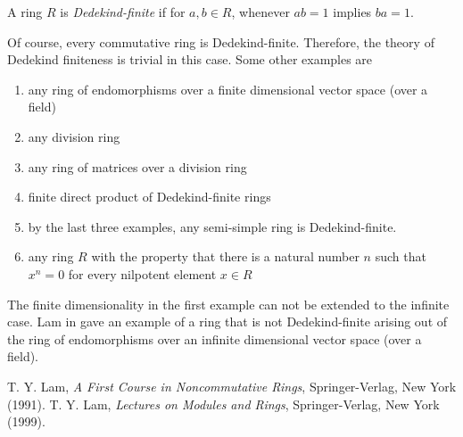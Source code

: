 \documentclass[12pt]{article}
\begin{document}
A ring $R$ is \emph{Dedekind-finite} if for $a, b \in R$, whenever $ab=1$ implies $ba=1$.

Of course, every commutative ring is Dedekind-finite.  Therefore, the theory of Dedekind finiteness is trivial in this case.  Some other examples are 
\begin{enumerate}
\item any ring of endomorphisms over a finite dimensional vector space (over a field)
\item any division ring
\item any ring of matrices over a division ring
\item finite direct product of Dedekind-finite rings
\item by the last three examples, any semi-simple ring is Dedekind-finite.
\item any ring $R$ with the property that there is a natural number $n$ such that $x^n=0$ for every nilpotent element $x\in R$
\end{enumerate}

The finite dimensionality in the first example can not be extended to the infinite case.  Lam in \cite{lam} gave an example of a ring that is not Dedekind-finite arising out of the ring of endomorphisms over an infinite dimensional vector space (over a field).

\begin{thebibliography}{8}
 T. Y. Lam, {\em A First Course in Noncommutative Rings}, Springer-Verlag, New York (1991).
 T. Y. Lam, {\em Lectures on Modules and Rings}, Springer-Verlag, New York (1999).
\end{thebibliography}
\end{document}
